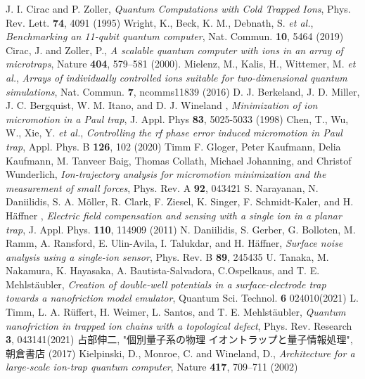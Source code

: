 \begin{thebibliography}{99}
	 J. I. Cirac and P. Zoller, \textit{Quantum Computations with Cold Trapped Ions}, Phys. Rev. Lett. \textbf{74}, 4091 (1995)
	  Wright, K., Beck, K. M., Debnath, S. \textit{et al.}, \textit{Benchmarking an 11-qubit quantum computer}, Nat. Commun. \textbf{10}, 5464 (2019)
	 Cirac, J. and Zoller, P., \textit{A scalable quantum computer with ions in an array of microtraps}, Nature \textbf{404}, 579–581 (2000). 
	 Mielenz, M., Kalis, H., Wittemer, M. \textit{et al.}, \textit{Arrays of individually controlled ions suitable for two-dimensional quantum simulations}, Nat. Commun. \textbf{7}, ncomms11839 (2016)
	 D. J. Berkeland, J. D. Miller, J. C. Bergquist, W. M. Itano, and D. J. Wineland , \textit{Minimization of ion micromotion in a Paul trap}, J. Appl. Phys \textbf{83}, 5025-5033 (1998)
	 Chen, T., Wu, W., Xie, Y. \textit{et al.}, \textit{Controlling the rf phase error induced micromotion in Paul trap}, Appl. Phys. B \textbf{126}, 102 (2020)
	 Timm F. Gloger, Peter Kaufmann, Delia Kaufmann, M. Tanveer Baig, Thomas Collath, Michael Johanning, and Christof Wunderlich, \textit{Ion-trajectory analysis for micromotion minimization and the measurement of small forces}, Phys. Rev. A \textbf{92}, 043421
	 S. Narayanan, N. Daniilidis, S. A. Möller, R. Clark, F. Ziesel, K. Singer, F. Schmidt-Kaler, and H. Häffner , \textit{Electric field compensation and sensing with a single ion in a planar trap}, J. Appl. Phys. \textbf{110}, 114909 (2011)
	 N. Daniilidis, S. Gerber, G. Bolloten, M. Ramm, A. Ransford, E. Ulin-Avila, I. Talukdar, and H. Häffner, \textit{Surface noise analysis using a single-ion sensor}, Phys. Rev. B \textbf{89}, 245435
	 U. Tanaka, M. Nakamura, K. Hayasaka, A. Bautista-Salvadora, C.Ospelkaus, and T. E. Mehlstäubler, \textit{Creation of double-well potentials in a surface-electrode trap towards a nanofriction model emulator}, Quantum Sci. Technol. \textbf{6} 024010(2021)
	 L. Timm, L. A. Rüffert, H. Weimer, L. Santos, and T. E. Mehlstäubler, \textit{Quantum nanofriction in trapped ion chains with a topological defect}, Phys. Rev. Research \textbf{3}, 043141(2021)
	 占部伸二, "個別量子系の物理 イオントラップと量子情報処理", 朝倉書店 (2017)
	 Kielpinski, D., Monroe, C. and Wineland, D., \textit{Architecture for a large-scale ion-trap quantum computer}, Nature \textbf{417}, 709–711 (2002)

\end{thebibliography}
